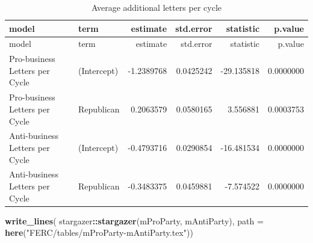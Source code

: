 \documentclass[]{article}
\newenvironment{Shaded}{\begin{snugshade}}{\end{snugshade}}
\newcommand{\KeywordTok}[1]{\textcolor[rgb]{0.13,0.29,0.53}{\textbf{#1}}}
\newcommand{\DataTypeTok}[1]{\textcolor[rgb]{0.13,0.29,0.53}{#1}}
\newcommand{\StringTok}[1]{\textcolor[rgb]{0.31,0.60,0.02}{#1}}
\newcommand{\OperatorTok}[1]{\textcolor[rgb]{0.81,0.36,0.00}{\textbf{#1}}}
\newcommand{\NormalTok}[1]{#1}
\begin{document}
\begin{longtable}[]{@{}llrrrr@{}}
\caption{Average additional letters per cycle}\tabularnewline
\toprule
model & term & estimate & std.error & statistic & p.value\tabularnewline
\midrule
\endfirsthead
\toprule
model & term & estimate & std.error & statistic & p.value\tabularnewline
\midrule
\endhead
Pro-business Letters per Cycle & (Intercept) & -1.2389768 & 0.0425242 &
-29.135818 & 0.0000000\tabularnewline
Pro-business Letters per Cycle & Republican & 0.2063579 & 0.0580165 &
3.556881 & 0.0003753\tabularnewline
Anti-business Letters per Cycle & (Intercept) & -0.4793716 & 0.0290854 &
-16.481534 & 0.0000000\tabularnewline
Anti-business Letters per Cycle & Republican & -0.3483375 & 0.0459881 &
-7.574522 & 0.0000000\tabularnewline
\bottomrule
\end{longtable}

\begin{Shaded}
\begin{Highlighting}[]
\KeywordTok{write_lines}\NormalTok{(}
\NormalTok{  stargazer}\OperatorTok{::}\KeywordTok{stargazer}\NormalTok{(mProParty, mAntiParty),}
  \DataTypeTok{path =} \KeywordTok{here}\NormalTok{(}\StringTok{"FERC/tables/mProParty-mAntiParty.tex"}\NormalTok{))}
\end{Highlighting}
\end{Shaded}
\end{document}
